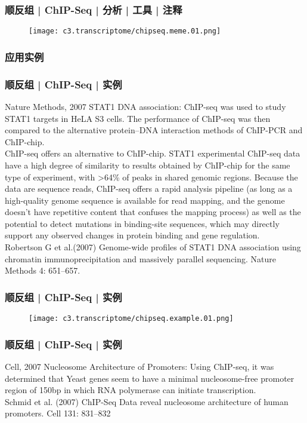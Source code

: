 \begin{frame}
  \frametitle{顺反组 | ChIP-Seq | 分析 | 工具 | 注释}
  \begin{figure}
    \centering
    \texttt{[image: c3.transcriptome/chipseq.meme.01.png]}
  \end{figure}
\end{frame}

\subsubsection{应用实例}
\begin{frame}
  \frametitle{顺反组 | ChIP-Seq | 实例}
  {\footnotesize
    \begin{block}{Nature Methods, 2007}
  STAT1 DNA association: ChIP-seq was used to study STAT1 targets in HeLA S3 cells. The performance of ChIP-seq was then compared to the alternative protein–DNA interaction methods of ChIP-PCR and ChIP-chip.\\
  \vspace{0.5em}
  ChIP-seq offers an alternative to ChIP-chip. STAT1 experimental ChIP-seq data have a high degree of similarity to results obtained by ChIP-chip for the same type of experiment, with >64\% of peaks in shared genomic regions. Because the data are sequence reads, ChIP-seq offers a rapid analysis pipeline (as long as a high-quality genome sequence is available for read mapping, and the genome doesn't have repetitive content that confuses the mapping process) as well as the potential to detect mutations in binding-site sequences, which may directly support any observed changes in protein binding and gene regulation.\\
  \vspace{0.5em}
  Robertson G et al.(2007) Genome-wide profiles of STAT1 DNA association using chromatin immunoprecipitation and massively parallel sequencing. Nature Methods 4: 651–657.
    \end{block}
}
\end{frame}

\begin{frame}
  \frametitle{顺反组 | ChIP-Seq | 实例}
  \begin{figure}
    \centering
    \texttt{[image: c3.transcriptome/chipseq.example.01.png]}
  \end{figure}
\end{frame}

\begin{frame}
  \frametitle{顺反组 | ChIP-Seq | 实例}
  \begin{block}{Cell, 2007}
  Nucleosome Architecture of Promoters: Using ChIP-seq, it was determined that Yeast genes seem to have a minimal nucleosome-free promoter region of 150bp in which RNA polymerase can initiate transcription.\\
  \vspace{0.5em}
  Schmid et al. (2007) ChIP-Seq Data reveal nucleosome architecture of human promoters. Cell 131: 831–832
  \end{block}
\end{frame}

